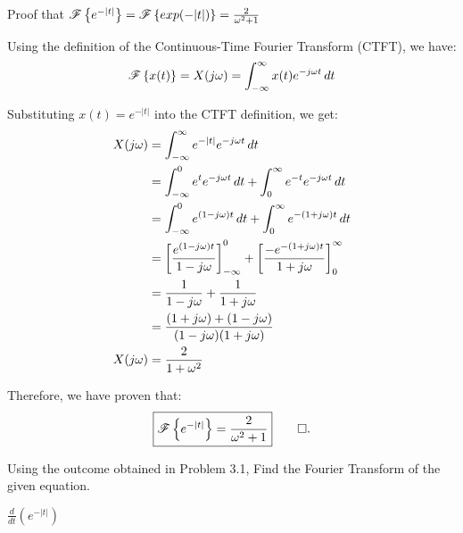 \documentclass[a4paper, 10pt]{article}
\begin{document}
\begin{subproblems}[start=1]
    \item Proof that \( \mathscr{F} \left\{ e^{-|t|} \right\} = \mathscr{F} \left\{ exp(-|t|) \right\} = \frac{2}{\omega^2+1} \)
\end{subproblems}

\begin{solution}
Using the definition of the Continuous-Time Fourier Transform (CTFT), we have:
\[
    \mathscr{F} \left\{ x(t) \right\} = X(j\omega) = \int_{-\infty}^{\infty} x(t) e^{-j\omega t} \,dt
\]

Substituting \( x(t) = e^{-|t|} \) into the CTFT definition, we get:
\begin{align*}  
    X(j\omega) &= \int_{-\infty}^{\infty} e^{-|t|} e^{-j\omega t} \,dt \\
    &= \int_{-\infty}^{0} e^{t} e^{-j\omega t} \,dt + \int_{0}^{\infty} e^{-t} e^{-j\omega t} \,dt \\
    &= \int_{-\infty}^{0} e^{(1 - j\omega) t} \,dt + \int_{0}^{\infty} e^{-(1 + j\omega) t} \,dt \\
    &= \left[ \frac{e^{(1 - j\omega) t}}{1 - j\omega} \right]_{-\infty}^{0} + \left[ \frac{-e^{-(1 + j\omega) t}}{1 + j\omega} \right]_{0}^{\infty} \\
    &= \frac{1}{1 - j\omega} + \frac{1}{1 + j\omega} \\
    &= \frac{(1 + j\omega) + (1 - j\omega)}{(1 - j\omega)(1 + j\omega)} \\
    X(j\omega) &= \frac{2}{1 + \omega^2}
\end{align*}

Therefore, we have proven that:
\[ \boxed{
    \mathscr{F} \left\{ e^{-|t|} \right\} = \frac{2}{\omega^2 + 1}
} \qed. \]
\end{solution}


\begin{subproblems}[start=2]
    \item Using the outcome obtained in Problem 3.1, Find the Fourier Transform of the given equation.
\end{subproblems}

\begin{subsubproblems}[start=1]
    \item \( \frac{d}{dt} (e^{-|t|}) \)
\end{subsubproblems}
\end{document}
